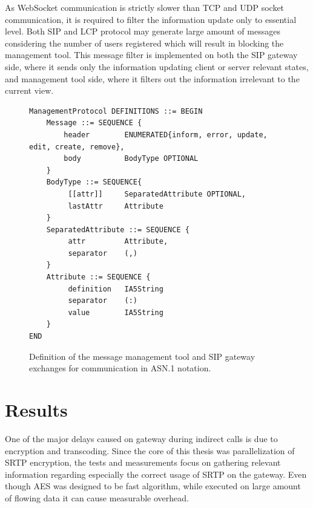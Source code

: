 As WebSocket communication is strictly slower than TCP and UDP socket
communication, it is required to filter the information update only to essential
level. Both SIP and LCP protocol may generate large amount of messages 
considering the number of users registered which will result in blocking the
management tool. This message filter is implemented on both the SIP gateway 
side, where it sends only the information updating client or server relevant 
states, and management tool side, where it filters out the information 
irrelevant to the current view.

\vspace{1em}

\begin{figure}[H]
\centering
\begin{verbatim}
ManagementProtocol DEFINITIONS ::= BEGIN
    Message ::= SEQUENCE {
        header        ENUMERATED{inform, error, update, edit, create, remove},
        body          BodyType OPTIONAL
    }
    BodyType ::= SEQUENCE{
         [[attr]]     SeparatedAttribute OPTIONAL,
         lastAttr     Attribute           
    }
    SeparatedAttribute ::= SEQUENCE {
         attr         Attribute,
         separator    (,)
    }
    Attribute ::= SEQUENCE {
         definition   IA5String
         separator    (:)
         value        IA5String
    }
END
\end{verbatim}
\vspace{-1em}
\caption[Management tool message definition]{Definition of the message 
management tool and SIP gateway exchanges for communication in ASN.1 notation.}
\label{tool-msg}
\end{figure}




\chapter{Results}\label{chapter:results}
One of the major delays caused on gateway during indirect calls is due to
encryption and transcoding. Since the core of this thesis was parallelization
of SRTP encryption, the tests and measurements focus on gathering relevant
information regarding especially the correct usage of SRTP on the gateway. Even
though AES was designed to be fast algorithm, while executed on large amount of
flowing data it can cause measurable overhead.

